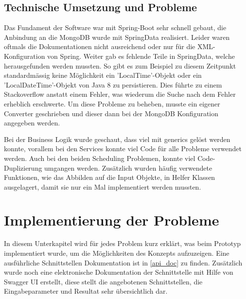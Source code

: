 \subsection{Technische Umsetzung und Probleme}
Das Fundament der Software war mit Spring-Boot \cite{spring_boot} sehr schnell gebaut, die Anbindung an die MongoDB wurde mit SpringData \cite{spring_data} realisiert. Leider waren 
oftmals die Dokumentationen nicht ausreichend oder nur für die XML-Konfiguration von Spring. Weiter gab es fehlende Teile in SpringData, welche herausgefunden werden mussten. 
So gibt es zum Beispiel zu diesem Zeitpunkt standardmässig keine Möglichkeit ein 'LocalTime'-Objekt oder ein 'LocalDateTime'-Objekt von Java 8 zu persistieren. Dies führte zu einem 
Stackoverflow anstatt einem Fehler, was wiederum die Suche nach dem Fehler erheblich erschwerte. Um diese Probleme zu beheben, musste ein eigener Converter geschrieben und dieser 
dann bei der MongoDB Konfiguration angegeben werden.

Bei der Business Logik wurde geschaut, dass viel mit \gls{generics} gelöst werden konnte, vorallem bei den Services konnte viel Code für alle Probleme verwendet werden. Auch 
bei den beiden Scheduling Problemen, konnte viel Code-Duplizierung umgangen werden. Zusätzlich wurden häufig verwendete Funktionen, wie das Abbilden auf die Input Objekte, in Helfer 
Klassen ausgelagert, damit sie nur ein Mal implementiert werden mussten.

\section{Implementierung der Probleme}\label{impl_problems}
In diesem Unterkapitel wird für jedes Problem kurz erklärt, was beim Prototyp implementiert wurde, um die Möglichkeiten des Konzepts aufzuzeigen. Eine ausführliche Schnittstellen 
Dokumentation ist in \autoref{api_doc} zu finden. Zusätzlich wurde noch eine elektronische Dokumentation der Schnittstelle mit Hilfe von Swagger UI erstellt, diese stellt die angebotenen 
Schnittstellen, die Eingabeparameter und Resultat sehr übersichtlich dar.

